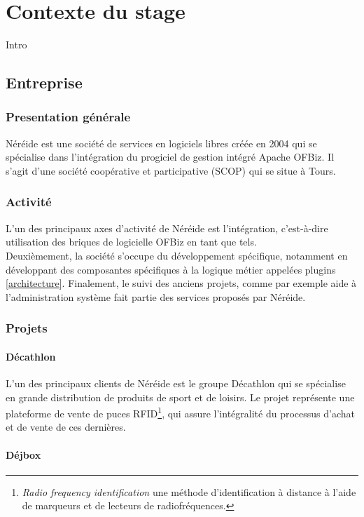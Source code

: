 \chapter{Contexte du stage}

Intro

\section{Entreprise}

\subsection{Presentation générale }
Néréide est une société de services en logiciels libres créée en 2004 qui se spécialise dans l'intégration du progiciel de gestion intégré Apache OFBiz. Il s'agit d'une société coopérative et participative (SCOP) qui se situe à Tours. 



\subsection{Activité}
\label{activite}


L'un des principaux axes d'activité de Néréide est l'intégration, c'est-à-dire utilisation des briques de logicielle OFBiz en tant que tels. \\
Deuxièmement, la société s'occupe du développement spécifique, notamment en développant des composantes spécifiques à la logique métier appelées plugins \ref{architecture}. 
Finalement, le suivi des anciens projets, comme par exemple aide à l'administration système fait partie des services proposés par Néréide. 
\subsection{Projets}
\subsubsection{Décathlon}
L'un des principaux clients de Néréide est le groupe Décathlon qui se spécialise en grande distribution de produits de sport et de loisirs. 
Le projet représente une plateforme de vente de puces RFID\footnote{\emph{Radio frequency identification} une méthode d'identification à distance à l'aide de marqueurs et de lecteurs de radiofréquences.}, qui assure l'intégralité du processus d'achat et de vente de ces dernières.

\subsubsection{Déjbox}

